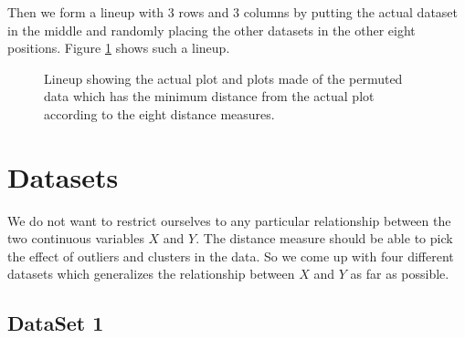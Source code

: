 Then we form a lineup with 3 rows and 3 columns by putting the actual dataset in the middle and randomly placing the other datasets in the other eight positions. Figure \ref{minimum} shows such a lineup.

\begin{figure}[htbp]
   \centering
	\vspace{-.2in}
       \caption{Lineup showing the actual plot and plots made of the permuted data which has the minimum distance from the actual plot according to the eight distance measures.  }
       \label{minimum}
\end{figure}      

\section{Datasets}

We do not want to restrict ourselves to any particular relationship between the two continuous variables $X$ and $Y$. The distance measure should be able to pick the effect of outliers and clusters in the data. So we come up with four different datasets which generalizes the relationship between $X$ and $Y$ as far as possible. \\

\subsection{DataSet 1}

